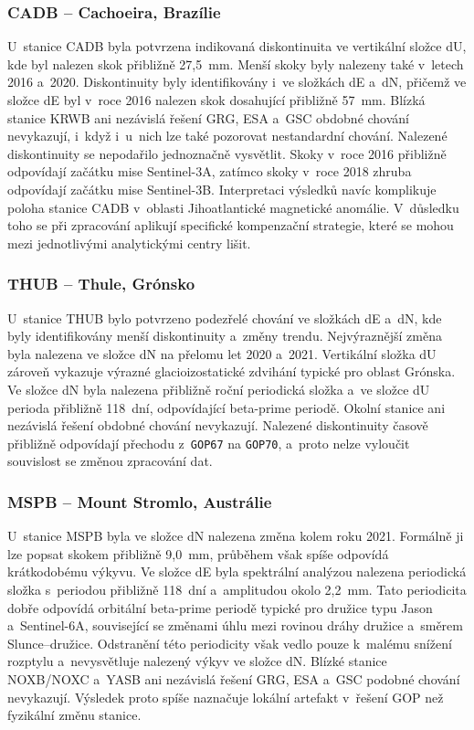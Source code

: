\subsubsection{CADB -- Cachoeira, Brazílie}

U~stanice CADB byla potvrzena indikovaná diskontinuita ve vertikální složce dU, kde byl nalezen skok přibližně 27{,}5~mm. Menší skoky byly nalezeny také v~letech 2016 a~2020. Diskontinuity byly identifikovány i~ve složkách dE a~dN, přičemž ve složce dE byl v~roce 2016 nalezen skok dosahující přibližně 57~mm. Blízká stanice KRWB ani nezávislá řešení GRG, ESA a~GSC obdobné chování nevykazují, i~když i~u~nich lze také pozorovat nestandardní chování. Nalezené diskontinuity se nepodařilo jedno\-značně vysvětlit. Skoky v~roce 2016 přibližně odpovídají začátku mise Sentinel-3A, zatímco skoky v~roce 2018 zhruba odpovídají začátku mise Sentinel-3B. Interpretaci výsledků navíc komplikuje poloha stanice CADB v~oblasti Jihoatlantické magnetické anomálie. V~důsledku toho se při zpracování aplikují specifické kompenzační strategie, které se mohou mezi jednotlivými analytickými centry lišit.

\subsubsection{THUB -- Thule, Grónsko}

U~stanice THUB bylo potvrzeno podezřelé chování ve složkách dE a~dN, kde byly identifikovány menší diskontinuity a~změny trendu. Nejvýraznější změna byla nalezena ve složce dN na přelomu let 2020 a~2021. Vertikální složka dU zároveň vykazuje výrazné glacioizostatické zdvihání typické pro oblast Grónska. Ve složce dN byla nalezena přibližně roční periodická složka a~ve složce dU perioda přibližně 118~dní, odpovídající beta-prime periodě. Okolní stanice ani nezávislá řešení obdobné chování nevykazují. Nalezené diskontinuity časově přibližně odpovídají přechodu z~\texttt{GOP67} na \texttt{GOP70}, a~proto nelze vyloučit souvislost se změnou zpracování dat.

\subsubsection{MSPB -- Mount Stromlo, Austrálie}

U~stanice MSPB byla ve složce dN nalezena změna kolem roku 2021. Formálně ji lze popsat skokem přibližně 9{,}0~mm, průběhem však spíše odpovídá krátkodobému výkyvu. Ve složce dE byla spektrální analýzou nalezena periodická složka s~periodou přibližně 118~dní a~amplitudou okolo 2{,}2~mm. Tato periodicita dobře odpovídá orbitální beta-prime periodě typické pro družice typu Jason a~Sentinel-6A, související se změnami úhlu mezi rovinou dráhy družice a~směrem Slunce--družice. Odstranění této periodicity však vedlo pouze k~malému snížení rozptylu a~nevysvětluje nalezený výkyv ve složce dN. Blízké stanice NOXB/NOXC a~YASB ani nezávislá řešení GRG, ESA a~GSC podobné chování nevykazují. Výsledek proto spíše naznačuje lokální artefakt v~řešení GOP než fyzikální změnu stanice.


